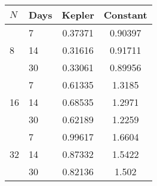 \begin{tabular}{l|lcc}
\hline
$N$ & Days & Kepler & Constant \\
\hline
\multirow{3}{*}{8} & 7 & 0.37371 & 0.90397 \\ 
&14 & 0.31616 & 0.91711 \\ 
&30 & 0.33061 & 0.89956 \\ \hline
\multirow{3}{*}{16} & 7 & 0.61335 & 1.3185 \\ 
&14 & 0.68535 & 1.2971 \\ 
&30 & 0.62189 & 1.2259 \\ \hline
\multirow{3}{*}{32} & 7 & 0.99617 & 1.6604 \\ 
&14 & 0.87332 & 1.5422 \\ 
&30 & 0.82136 & 1.502 \\\hline
\end{tabular}